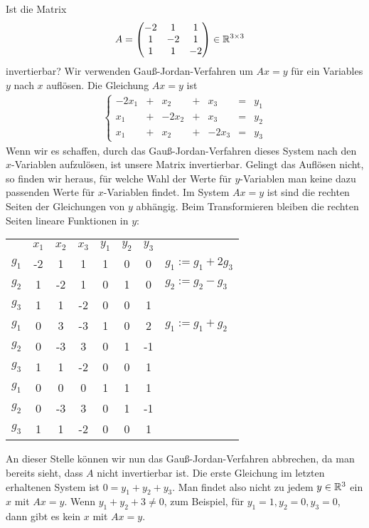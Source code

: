 \begin{bsp} Ist die Matrix
	\begin{align*}
		A &=
		\begin{pmatrix}
			-2 & 1 & 1\\
			1 & -2 & 1\\
			1 & 1 & -2
		\end{pmatrix}
		\in \mathbb R^{3 \times 3}
	\end{align*}
	invertierbar? Wir verwenden Gauß-Jordan-Verfahren um $A x = y$ für ein Variables $y$ nach $x$ auflösen. Die Gleichung $A x = y$ ist 
	\begin{align*}
		 \left\{
		\begin{array}{rcrcrcl}
		-2x_1 &+&   x_2 &+&   x_3 &=& y_1\\
		  x_1 &+& -2x_2 &+&   x_3 &=& y_2\\
		  x_1 &+&   x_2 &+& -2x_3 &=& y_3
		\end{array}
		\right.
	\end{align*}
	Wenn wir es schaffen, durch das Gauß-Jordan-Verfahren dieses System nach den $x$-Variablen aufzulösen, ist unsere Matrix invertierbar. Gelingt das Auflösen nicht, so finden wir heraus, für welche Wahl der Werte für $y$-Variablen man keine dazu passenden Werte für $x$-Variablen findet. Im System $A x = y$ ist sind die rechten Seiten der Gleichungen von $y$ abhängig. Beim Transformieren bleiben die rechten Seiten lineare Funktionen in $y$: 
	
	\begin{center}
	\begin{tabular}{c|ccc|cccl}
	& $ x_1 $ & $ x_2 $ & $ x_3 $ & $ y_1 $ & $ y_2 $ & $ y_3 $ & \\
	\cline{1-7}
	$ g_1 $ & -2 & 1 & 1 & 1 & 0 & 0 & $ g_1 := g_1 + 2g_3 $ \\
	$ g_2 $ & 1 & -2 & 1 & 0 & 1 & 0 & $ g_2 := g_2 - g_3 $ \\
	$ g_3 $ & 1 & 1 & -2 & 0 & 0 & 1 &  \\
	\cline{1-7}
	$ g_1 $ & 0 & 3 & -3 &  1 & 0 & 2 & $ g_1 := g_1  + g_2 $ \\
	$ g_2 $ & 0 & -3 & 3 & 0 & 1 & -1 & \\
	$ g_3 $ & 1 & 1 & -2 & 0 & 0 & 1 & \\
	\cline{1-7}
	$ g_1 $ & {\color{red} 0} &  {\color{red} 0}&  {\color{red} 0}& 1 & 1 & 1 &  \\
	$ g_2 $ & 0 & -3 & 3 & 0 & 1 & -1 & \\
	$ g_3 $ & 1 & 1 & -2 & 0 & 0 & 1 & \\
	\cline{1-7}
	\end{tabular}
	\end{center}
	An dieser Stelle können wir nun das Gauß-Jordan-Verfahren abbrechen, da man bereits sieht, dass $A$ nicht invertierbar ist. Die erste Gleichung im letzten erhaltenen System ist $0 = y_1 + y_2 + y_3$. Man findet also  nicht zu jedem $y \in \mathbb R^3$ ein $x$ mit $A x = y$. Wenn $y_1 + y_2 + 3 \ne 0$, zum Beispiel, für $y_1 = 1, y_2=0, y_3=0$, dann gibt es kein $x$ mit $A x = y$. 
\end{bsp}

